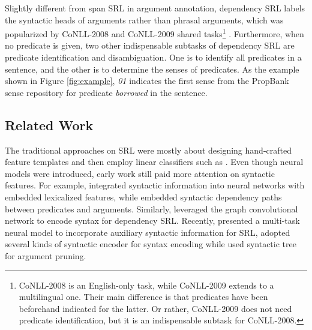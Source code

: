 \documentclass[letterpaper]{article} %
\begin{document}
Slightly different from span SRL in argument annotation, dependency SRL labels the syntactic heads of arguments rather than phrasal arguments, which was popularized by CoNLL-2008 and CoNLL-2009 shared tasks\footnote{CoNLL-2008 is an English-only task, while CoNLL-2009 extends to a multilingual one. Their main difference is that predicates have been beforehand indicated for the latter. Or rather, CoNLL-2009 does not need predicate identification, but it is an indispensable subtask for CoNLL-2008.} \cite{surdeanu-EtAl2008,hajivc-EtAl2009}. Furthermore, when no predicate is given, two other indispensable subtasks of dependency SRL are predicate identification and disambiguation. One is to identify all predicates in a sentence, and the other is to determine the senses of predicates. As the example shown in Figure \ref{fig:example}, \textit{01} indicates the first sense from the PropBank sense repository for predicate \textit{borrowed} in the sentence.

\subsection{Related Work}

The traditional approaches on SRL were mostly about designing hand-crafted feature templates and then employ linear classifiers such as \cite{pradhan2005,punyakanok2008importance,Zhao2009Conll}. Even though neural models were introduced, early work still paid more attention on syntactic features.
For example, \citeauthor{Fitzgerald2015}  integrated syntactic information into neural networks with embedded lexicalized features, while \citeauthor{roth2016}  embedded syntactic dependency paths between predicates and arguments. Similarly, \citeauthor{marcheggianiEMNLP2017}  leveraged the graph convolutional network to encode syntax for dependency SRL. Recently, \citeauthor{Strubell2018}  presented a multi-task neural model to incorporate auxiliary syntactic information for SRL, \citeauthor{li2018unified}  adopted several kinds of syntactic encoder for syntax encoding while \citeauthor{he:2018Syntax}  used syntactic tree for argument pruning.
\end{document}
